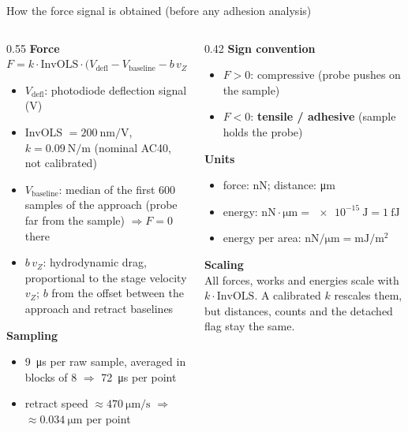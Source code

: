 \documentclass[aspectratio=169,9pt]{beamer}
\begin{document}
\begin{frame}{How the force signal is obtained (before any adhesion analysis)}
\begin{columns}[T]
\begin{column}{0.55\textwidth}\small
\textbf{Force}\\[2pt]
$F = k\cdot \text{InvOLS}\cdot\bigl(V_\text{defl} - V_\text{baseline} - b\,v_Z\bigr)$
\begin{itemize}
\item $V_\text{defl}$: photodiode deflection signal (V)
\item InvOLS $=\SI{200}{\nano\metre\per\volt}$, $k=\SI{0.09}{\newton\per\metre}$ (nominal AC40, not calibrated)
\item $V_\text{baseline}$: median of the first 600 samples of the approach (probe far from the sample) $\Rightarrow F=0$ there
\item $b\,v_Z$: hydrodynamic drag, proportional to the stage velocity $v_Z$; $b$ from the offset between the approach and retract baselines
\end{itemize}
\textbf{Sampling}
\begin{itemize}
\item \SI{9}{\micro\second} per raw sample, averaged in blocks of 8 $\Rightarrow$ \SI{72}{\micro\second} per point
\item retract speed $\approx\SI{470}{\micro\metre\per\second}$ $\Rightarrow$ $\approx\SI{0.034}{\micro\metre}$ per point
\end{itemize}
\end{column}
\begin{column}{0.42\textwidth}\small
\textbf{Sign convention}
\begin{itemize}
\item $F>0$: compressive (probe pushes on the sample)
\item $F<0$: \textbf{tensile / adhesive} (sample holds the probe)
\end{itemize}
\textbf{Units}
\begin{itemize}
\item force: \si{\nano\newton}; distance: \si{\micro\metre}
\item energy: $\si{\nano\newton}\cdot\si{\micro\metre}=\SI{e-15}{\joule}=\SI{1}{\femto\joule}$
\item energy per area: $\si{\nano\newton\per\micro\metre}=\si{\milli\joule\per\square\metre}$
\end{itemize}
\textbf{Scaling}\\
All forces, works and energies scale with $k\cdot\text{InvOLS}$. A calibrated $k$ rescales them, but distances, counts and the detached flag stay the same.
\end{column}
\end{columns}
\end{frame}
\end{document}

